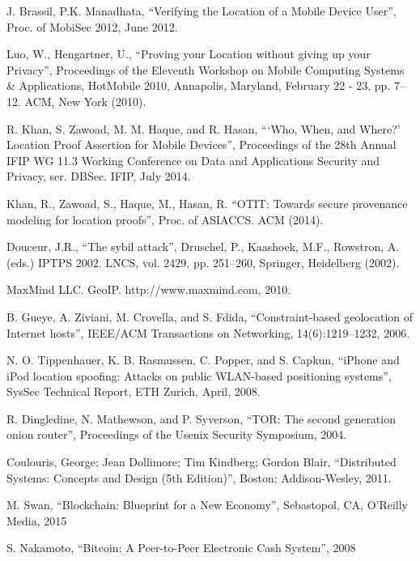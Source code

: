 \documentclass[12pt]{report}
\begin{document}
\newpage
\begin{thebibliography}{9}

  J. Brassil, P.K. Manadhata,
  ``Verifying the Location of a Mobile Device User'',
  Proc. of MobiSec 2012,
  June 2012.

  Luo, W., Hengartner, U.,
  ``Proving your Location without giving up your Privacy'',
  Proceedings of the Eleventh Workshop on Mobile Computing Systems \& Applications,
  HotMobile 2010, Annapolis, Maryland, February 22 - 23, pp. 7–12. ACM,
  New York (2010).

  R. Khan, S. Zawoad, M. M. Haque, and R. Hasan,
  ```Who, When, and Where?' Location Proof Assertion for Mobile Devices'',
  Proceedings of the 28th Annual IFIP WG 11.3 Working Conference on Data and Applications Security and Privacy, ser. DBSec. IFIP,
  July 2014.
 
  Khan, R., Zawoad, S., Haque, M., Hasan, R.
  ``OTIT: Towards secure provenance modeling for location proofs'',
  Proc. of ASIACCS. ACM (2014).

  Douceur, J.R.,
  ``The sybil attack'',
  Druschel, P., Kaashoek, M.F., Rowstron, A. (eds.) IPTPS 2002. LNCS, vol. 2429, pp. 251–260,
  Springer, Heidelberg (2002).

  MaxMind LLC. GeoIP. http://www.maxmind.com,
  2010.

  B. Gueye, A. Ziviani, M. Crovella, and S. Fdida,
  ``Constraint-based geolocation of Internet hosts'',
  IEEE/ACM Transactions on Networking,
  14(6):1219–1232, 2006.

  N. O. Tippenhauer, K. B. Rasmussen, C. Popper, and S. Capkun,
  ``iPhone and iPod location spoofing: Attacks on public WLAN-based positioning systems'',
  SysSec Technical Report,
  ETH Zurich, April, 2008.

  R. Dingledine, N. Mathewson, and P. Syverson,
  ``TOR: The second generation onion router'',
  Proceedings of the Usenix Security Symposium,
  2004.

  Coulouris, George; Jean Dollimore; Tim Kindberg; Gordon Blair,
  ``Distributed Systems: Concepts and Design (5th Edition)'',
  Boston: Addison-Wesley,
  2011.

  M. Swan,
  ``Blockchain: Blueprint for a New Economy'',
  Sebastopol, CA,
  O’Reilly Media, 2015

  S. Nakamoto,
  ``Bitcoin: A Peer-to-Peer Electronic Cash System'',
  2008

\end{thebibliography}
\end{document}
